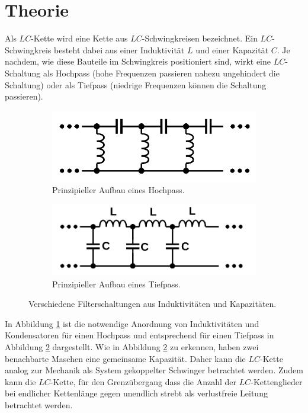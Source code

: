 \section{Theorie}
\label{sec:Theorie}
Als $LC$-Kette wird eine Kette aus $LC$-Schwingkreisen bezeichnet.
Ein $LC$-Schwingkreis besteht dabei aus einer Induktivität $L$ und einer Kapazität $C$. Je nachdem, wie diese Bauteile
im Schwingkreis positioniert sind, wirkt eine $LC$-Schaltung als Hochpass (hohe Frequenzen passieren nahezu ungehindert die Schaltung)
oder als Tiefpass (niedrige Frequenzen können die Schaltung passieren).
\begin{figure}
    \centering
    \begin{subfigure}{0.48\textwidth}
        \includegraphics[width=\textwidth]{Bilder/hochpass_schema.png}
        \caption{Prinzipieller Aufbau eines Hochpass.}
        \label{fig:hoch}
    \end{subfigure}
    \begin{subfigure}{0.48\textwidth}
        \includegraphics[width=\textwidth]{Bilder/tiefpass_schema.png}
        \caption{Prinzipieller Aufbau eines Tiefpass.}
        \label{fig:tief}
    \end{subfigure}
    \caption{Verschiedene Filterschaltungen aus Induktivitäten und Kapazitäten. \cite{Anleitung}}\label{fig:filter}
\end{figure}
In Abbildung \ref{fig:hoch} ist die notwendige Anordnung von Induktivitäten
und Kondensatoren für einen Hochpass und entsprechend für einen Tiefpass in Abbildung \ref{fig:tief} dargestellt.
Wie in Abbildung \ref{fig:tief} zu erkennen, haben zwei benachbarte Maschen eine gemeinsame Kapazität. Daher kann die $LC$-Kette analog zur
Mechanik als System gekoppelter Schwinger betrachtet werden.
Zudem kann die $LC$-Kette, für den Grenzübergang dass die Anzahl der $LC$-Kettenglieder bei endlicher Kettenlänge gegen unendlich strebt als verlustfreie Leitung betrachtet werden.

